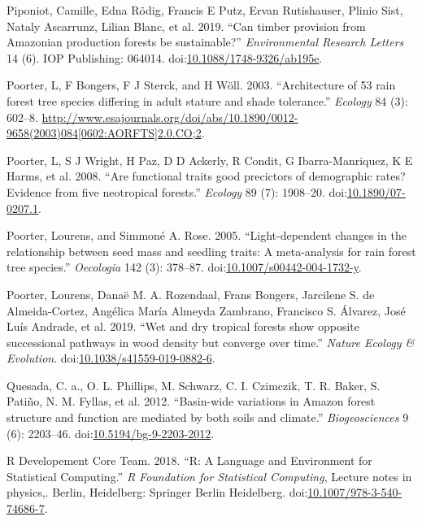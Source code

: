 \documentclass[]{elsarticle} %
\begin{document}
\hypertarget{ref-Piponiot2019}{}
Piponiot, Camille, Edna Rödig, Francis E Putz, Ervan Rutishauser, Plinio
Sist, Nataly Ascarrunz, Lilian Blanc, et al. 2019. ``Can timber
provision from Amazonian production forests be sustainable?''
\emph{Environmental Research Letters} 14 (6). IOP Publishing: 064014.
doi:\href{https://doi.org/10.1088/1748-9326/ab195e}{10.1088/1748-9326/ab195e}.

\hypertarget{ref-Poorter2003}{}
Poorter, L, F Bongers, F J Sterck, and H Wöll. 2003. ``Architecture of
53 rain forest tree species differing in adult stature and shade
tolerance.'' \emph{Ecology} 84 (3): 602--8.
\href{http://www.esajournals.org/doi/abs/10.1890/0012-9658(2003)084\%5B0602:AORFTS\%5D2.0.CO;2}{http://www.esajournals.org/doi/abs/10.1890/0012-9658(2003)084{[}0602:AORFTS{]}2.0.CO;2}.

\hypertarget{ref-Poorter2008a}{}
Poorter, L, S J Wright, H Paz, D D Ackerly, R Condit, G
Ibarra-Manriquez, K E Harms, et al. 2008. ``Are functional traits good
precictors of demographic rates? Evidence from five neotropical
forests.'' \emph{Ecology} 89 (7): 1908--20.
doi:\href{https://doi.org/10.1890/07-0207.1}{10.1890/07-0207.1}.

\hypertarget{ref-Poorter2005a}{}
Poorter, Lourens, and Simmoné A. Rose. 2005. ``Light-dependent changes
in the relationship between seed mass and seedling traits: A
meta-analysis for rain forest tree species.'' \emph{Oecologia} 142 (3):
378--87.
doi:\href{https://doi.org/10.1007/s00442-004-1732-y}{10.1007/s00442-004-1732-y}.

\hypertarget{ref-Poorter2019}{}
Poorter, Lourens, Danaë M. A. Rozendaal, Frans Bongers, Jarcilene S. de
Almeida-Cortez, Angélica María Almeyda Zambrano, Francisco S. Álvarez,
José Luís Andrade, et al. 2019. ``Wet and dry tropical forests show
opposite successional pathways in wood density but converge over time.''
\emph{Nature Ecology \& Evolution}.
doi:\href{https://doi.org/10.1038/s41559-019-0882-6}{10.1038/s41559-019-0882-6}.

\hypertarget{ref-Quesada2012}{}
Quesada, C. a., O. L. Phillips, M. Schwarz, C. I. Czimczik, T. R. Baker,
S. Patiño, N. M. Fyllas, et al. 2012. ``Basin-wide variations in Amazon
forest structure and function are mediated by both soils and climate.''
\emph{Biogeosciences} 9 (6): 2203--46.
doi:\href{https://doi.org/10.5194/bg-9-2203-2012}{10.5194/bg-9-2203-2012}.

\hypertarget{ref-RDevelopementTeam2018}{}
R Developement Core Team. 2018. ``R: A Language and Environment for
Statistical Computing.'' \emph{R Foundation for Statistical Computing},
Lecture notes in physics,. Berlin, Heidelberg: Springer Berlin
Heidelberg.
doi:\href{https://doi.org/10.1007/978-3-540-74686-7}{10.1007/978-3-540-74686-7}.
\end{document}
